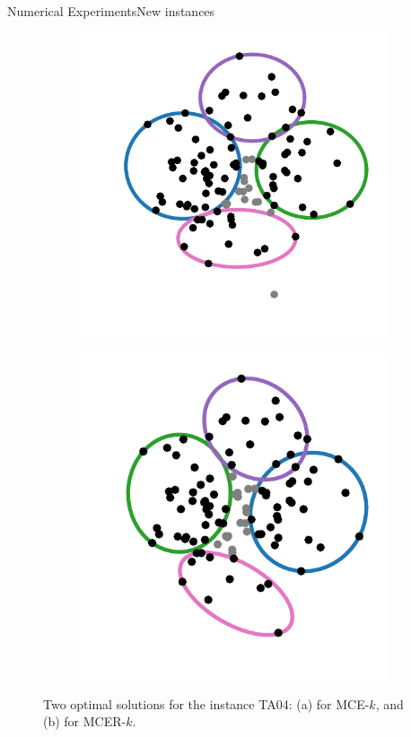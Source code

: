 \documentclass{beamer}
\theoremstyle{definition}
\begin{document}
\begin{frame}{Numerical Experiments}{New instances}
	\begin{figure}
		\begin{subfigure}{.44\textwidth}
			\centering
			\includegraphics[scale=.6]{../article/figures/MCE_TA04}
			\caption{}
			\label{fig:MCE_TA04}
		\end{subfigure}
		\begin{subfigure}{.44\textwidth}
			\centering
			\includegraphics[scale=.6]{../article/figures/MCER_TA04}
			\caption{}
			\label{fig:MCER_TA04}
		\end{subfigure}
		\caption{Two optimal solutions for the instance TA04: (a) for MCE-$k$, and (b) for MCER-$k$.}
		\label{fig:TA04}
	\end{figure}
\end{frame}
\end{document}
